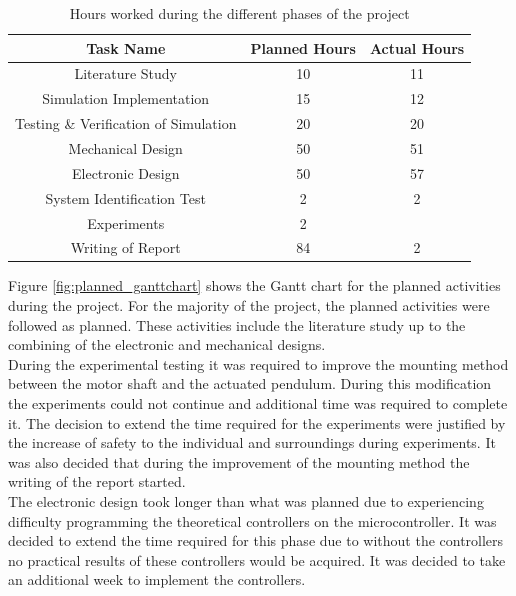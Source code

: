 \begin{table}[h]
	\centering
	\begin{tabular}{|c|c|c|}
		\hline
		Task Name & Planned Hours & Actual Hours \\
		\hline
		\hline
		Literature Study & 10 & 11 \\
		\hline
		Simulation Implementation & 15 & 12 \\
		\hline
		Testing \& Verification of Simulation & 20 & 20 \\
		\hline 
		Mechanical Design  & 50 & 51 \\
		\hline
		Electronic Design & 50 & 57 \\
		\hline
		System Identification Test & 2 & 2 \\
		\hline
		Experiments & 2 & \\
		\hline
		Writing of Report & 84 & 2 \\
		\hline
		
	\end{tabular}
	\caption{Hours worked during the different phases of the project}
	\label{table:hours_worked}
\end{table}

Figure \ref{fig:planned_ganttchart} shows the Gantt chart for the planned activities during the project. For the majority of the project, the planned activities were followed as planned. These activities include the literature study up to the combining of the electronic and mechanical designs.\\

During the experimental testing it was required to improve the mounting method between the motor shaft and the actuated pendulum. During this modification the experiments could not continue and additional time was required to complete it. The decision to extend the time required for the experiments were justified by the increase of safety to the individual and surroundings during experiments. It was also decided that during the improvement of the mounting method the writing of the report started.\\	

The electronic design took longer than what was planned due to experiencing difficulty programming the theoretical controllers on the microcontroller. It was decided to extend the time required for this phase due to without the controllers no practical results of these controllers would be acquired. It was decided to take an additional week to implement the controllers.\\

